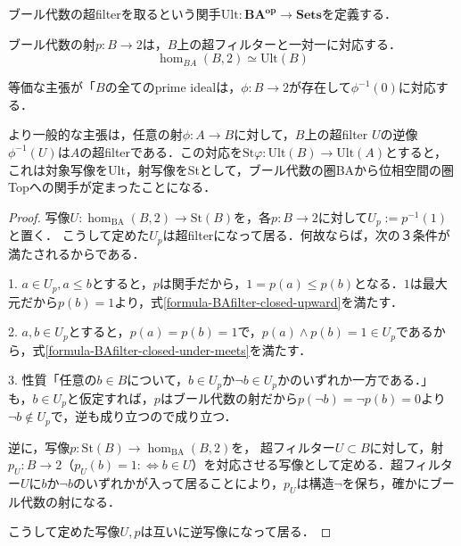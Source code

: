 \documentclass[uplatex, 12pt, dvipdfmx]{jsarticle}
\begin{document}
\begin{definition*}
    ブール代数の超filterを取るという関手$\mathrm{Ult}:\mathbf{BA^{op}}\to\mathbf{Sets}$を定義する．
\end{definition*}
\begin{proposition*}
    ブール代数の射$p:B\to 2$は，$B$上の超フィルターと一対一に対応する．
    \[ \hom_{BA}(B,2)\simeq \mathrm{Ult}(B) \]
\end{proposition*}
\begin{remark*}
    等価な主張が「$B$の全てのprime idealは，$\phi:B\to 2$が存在して$\phi^{-1}(0)$に対応する．

    より一般的な主張は，任意の射$\phi:A\to B$に対して，$B$上の超filter $U$の逆像$\phi^{-1}(U)$は$A$の超filterである．この対応を$\mathrm{St}\varphi:\mathrm{Ult}(B)\to\mathrm{Ult}(A)$とすると，
    これは対象写像をUlt，射写像をStとして，ブール代数の圏BAから位相空間の圏Topへの関手が定まったことになる．
\end{remark*}
\begin{proof}
    写像$U:\hom_{\mathrm{BA}}(B,2)\to \mathrm{St}(B)$を，各$p:B\to 2$に対して$U_p:=p^{-1}(1)$と置く．
    こうして定めた$U_p$は超filterになって居る．何故ならば，次の３条件が満たされるからである．
    
    1. $a\in U_p,a\le b$とすると，$p$は関手だから，$1=p(a)\le p(b)$となる．$1$は最大元だから$p(b)=1$より，式\ref{formula-BAfilter-closed-upward}を満たす．
    
    2. $a,b\in U_p$とすると，$p(a)=p(b)=1$で，$p(a)\land p(b) = 1\in U_p$であるから，式\ref{formula-BAfilter-closed-under-meets}を満たす．

    3. 性質「任意の$b\in B$について，$b\in U_p$か$\lnot b\in U_p$かのいずれか一方である．」も，$b\in U_p$と仮定すれば，$p$はブール代数の射だから$p(\lnot b)=\lnot p(b)=0$より$\lnot b\notin U_p$で，逆も成り立つので成り立つ．

    逆に，写像$p:\mathrm{St}(B)\to\hom_{\mathrm{BA}}(B,2)$を，
    超フィルター$U\subset B$に対して，射$p_U:B\to 2$（$p_U(b)=1:\Leftrightarrow b\in U$）を対応させる写像として定める．超フィルター$U$に$b$か$\lnot b$のいずれかが入って居ることにより，$p_U$は構造$\lnot$を保ち，確かにブール代数の射になる．

    こうして定めた写像$U,p$は互いに逆写像になって居る．
\end{proof}
\end{document}
